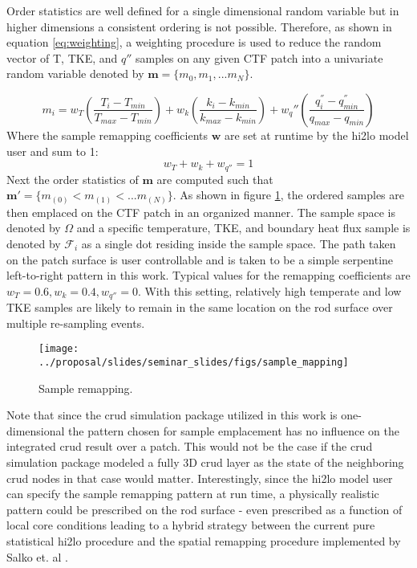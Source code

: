 Order statistics are well defined for a single dimensional random variable but in higher dimensions a consistent ordering is not possible.  Therefore, as shown in equation \ref{eq:weighting}, a weighting procedure is used to reduce the random vector of T, TKE, and $q''$ samples on any given CTF patch into a univariate random variable denoted by $\mathbf{m}=\{m_0, m_1, ... m_N\}$.

\begin{equation}
    m_i = w_T \left( \frac{T_i - T_{min}}{T_{max} - T_{min}} \right) + w_k \left( \frac{k_i - k_{min}}{k_{max} - k_{min}} \right) +  w_q'' \left( \frac{q^{''}_i - q^{''}_{min}}{q_{max} - q_{min}} \right)
\label{eq:weighting}
\end{equation}
Where the sample remapping coefficients $\mathbf w$ are set at runtime by the hi2lo model user and sum to 1:
\begin{equation}
w_T + w_k + w_{q''} = 1
\end{equation}
Next the order statistics of $\mathbf m$ are computed such that $\mathbf m' = \{ m_{(0)} < m_{(1)}< ... m_{(N)} \}$.  As shown in figure \ref{fig:samplemapping}, the ordered samples are then emplaced on the CTF patch in an organized manner.  The sample space is denoted by $\Omega$ and a specific temperature, TKE, and boundary heat flux sample is denoted by $\mathcal F_i$ as a single dot residing inside the sample space.  The path taken on the patch surface is user controllable and is taken to be a simple serpentine left-to-right pattern in this work.
Typical values for the remapping coefficients are $w_T=0.6, w_k=0.4, w_{q''}=0$.  With this setting, relatively high temperate and low TKE samples are likely to remain in the same location on the rod surface over multiple re-sampling events.

\begin{figure}[H]
    \centering
    \texttt{[image: ../proposal/slides/seminar\_slides/figs/sample\_mapping]}
    \caption{Sample remapping.}
    \label{fig:samplemapping}
\end{figure}

Note that since the crud simulation package utilized in this work is one-dimensional the pattern chosen for sample emplacement has no influence on the integrated crud result over a patch.  This would not be the case if the crud simulation package modeled a fully 3D crud layer as the state of the neighboring crud nodes in that case would matter.  Interestingly, since the hi2lo model user  can specify the sample remapping pattern at run time, a physically realistic pattern could be prescribed on the rod surface - even prescribed as a function of local core conditions leading to a hybrid strategy between the current pure statistical hi2lo procedure and the spatial remapping procedure implemented by Salko et. al \cite{salko17}.

